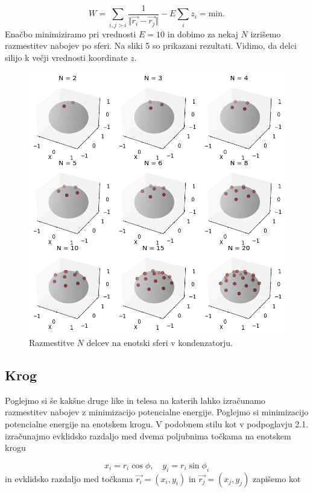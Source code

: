 \documentclass[slovene,11pt,a4paper]{article}
\begin{document}
\begin{equation}
W = \sum_{i, j>i} \frac{1}{\Vert \vec{r_i}-\vec{r_j} \Vert} - E \sum_i z_i = \text{min}.
\end{equation}
Enačbo minimiziramo pri vrednosti $E=10$ in dobimo za nekaj $N$ izrišemo razmestitev nabojev po sferi. Na sliki 5 so prikazani rezultati. Vidimo, da delci silijo k večji vrednosti koordinate $z$.

\begin{figure}[h!]
\centering
\includegraphics[width=12.5cm]{sfera2.png}
\caption{Razmestitve $N$ delcev na enotski sferi v kondenzatorju.}
\end{figure}

\subsection{Krog}

Poglejmo si še kakšne druge like in telesa na katerih lahko izračunamo razmestitev nabojev z minimizacijo potencialne energije. Poglejmo si minimizacijo potencialne energije na enotskem krogu. V podobnem stilu kot v podpoglavju 2.1. izračunajmo evklidsko razdaljo med dvema poljubnima točkama na enotskem krogu

\[
x_i = r_i \cos\phi, \quad y_i = r_i \sin\phi_i
\]
in evklidsko razdaljo med točkama $\vec{r_i} = (x_i, y_i)$ in $\vec{r_j} = (x_j, y_j)$ zapišemo kot
\end{document}

